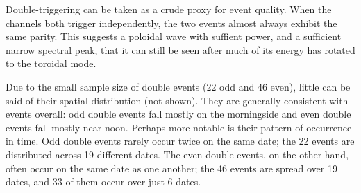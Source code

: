 Double-triggering can be taken as a crude proxy for event quality. When the
channels both trigger independently, the two events almost always
exhibit the same parity. This suggests a poloidal wave with suffient
power, and a sufficient narrow spectral peak, that it can still be seen after
much of its energy has rotated to the toroidal mode. 

Due to the small sample size of double events (22 odd and 46 even), little
can be said of their spatial distribution (not shown). They are generally
consistent with events overall: odd double events fall mostly on the
morningside and even double events fall mostly near noon. Perhaps more notable
is their pattern of occurrence in time. Odd double events rarely occur twice on
the same date; the 22 events are distributed across 19 different dates. The
even double events, on the other hand, often occur on the same date as one
another; the 46 events are spread over 19 dates, and 33 of them occur over just
6 dates. 





